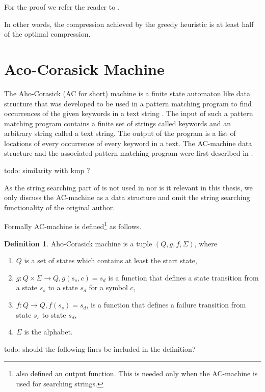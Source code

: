 \documentclass[english,twoside,censored,csm,algorithms-track-2020]{HYthesisML}
\theoremstyle{plain}
\theoremstyle{definition}
\newtheorem{definition}[theorem]{Definition}
\begin{document}
For the proof we refer the reader to \citep{Tarhio88}.

In other words, the compression achieved by the greedy heuristic is at least half of the optimal
compression. 




\section{Aco-Corasick Machine}


  
The Aho-Corasick (AC for short) machine is a finite state automaton like data structure that was
developed to be used
in a pattern matching program to find occurrences of the given keywords in a text string \citep{Aho75}.
The input of such a pattern matching program contains a finite set of strings called keywords and an
arbitrary string called a text string. The output of the program is a list of locations of every
occurrence of every keyword in a text. The AC-machine data structure and the associated pattern
matching program were first described in \citep{Aho75}.

todo: similarity with kmp ?

As the string searching part of \citep{Aho75} is not used in \citep{Ukkonen90} nor is it relevant in
this thesis, we only discuss the AC-machine as a data structure and omit the string searching
functionality of the original author.

Formally AC-machine is defined\footnote{\citep{Aho75} also defined an output function.
This is needed only when the AC-machine is used for searching strings.} as follows.

\begin{definition}
  Aho-Corasick machine is a tuple $(Q, g, f, \Sigma)$, where
  \begin{enumerate}
    \item $Q$ is a set of states which contains at least the start state, \\
    \item $g : Q \times \Sigma \rightarrow Q, g(s_s,c) = s_d$ is a function that defines a state transition from a state $s_s$ to a state $s_d$ for a symbol $c$, \\
    \item $f : Q \rightarrow Q, f(s_s) = s_d$, is a function that defines a failure transition from state $s_s$ to state $s_d$,
      \item $\Sigma$ is the alphabet.
  \end{enumerate}
\end{definition}
todo: should the following lines be included in the definition?
\end{document}

